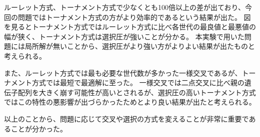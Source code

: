 \documentclass{jsarticle}
\begin{document}
ルーレット方式、トーナメント方式で少なくとも100倍以上の差が出ており、今回の問題ではトーナメント方式の方がより効率的であるという結果が出た。
図を見るとトーナメント方式ではルーレット方式に比べ各世代の最良値と最悪値の幅が狭く、トーナメント方式は選択圧が強いことが分かる。
本実験で用いた問題には局所解が無いことから、選択圧がより強い方がよりよい結果が出たものと考えられる。

また、ルーレット方式では最も必要な世代数が多かった一様交叉であるが、トーナメント方式では最短で最適解に至った。
一様交叉では二点交叉に比べ親の遺伝子配列を大きく崩す可能性が高いとされるが、選択圧の高いトーナメント方式ではこの特性の悪影響が出づらかったためとより良い結果が出たと考えられる。

以上のことから、問題に応じて交叉や選択の方式を変えることが非常に重要であることが分かった。
\end{document}
